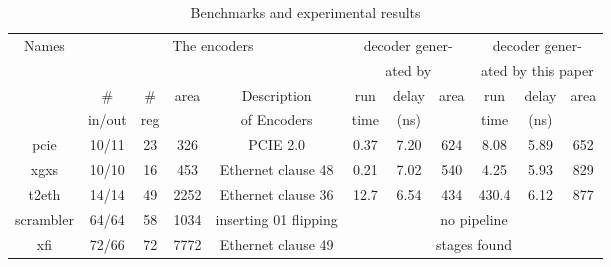 \documentclass[conference]{IEEEtran}
\begin{document}
\begin{table}[t]
\caption{Benchmarks and experimental results}
\begin{tabular}{|c|c|c|c|c|c|c|c|c|c|c|}
\hline
 Names     & \multicolumn{4}{|c|}{The encoders}                                  &   \multicolumn{3}{|c|}{decoder gener-}             &   \multicolumn{3}{|c|}{decoder gener-} \\    
           & \multicolumn{4}{|c|}{}                                              &   \multicolumn{3}{|c|}{ated by \cite{ShenTCAD11}}  &   \multicolumn{3}{|c|}{ated by this paper} \\\cline{2-11}
           &    \#   &   \#    &area  & Description                             &run  &delay&area                                     &run  &delay&area \\
           & in/out  &  reg    &      &   of Encoders                            &time &(ns) &                                        &time &(ns) &    \\\hline\hline
 pcie      & 10/11   & 23      & 326  &PCIE 2.0 \cite{pcie}                    &0.37 &7.20 &624                                     &8.08 & 5.89&652 \\\hline
 xgxs      & 10/10   & 16      & 453  &     Ethernet clause 48 \cite{IEEE8023_S4}&0.21 &7.02 &540                                     &4.25 & 5.93&829 \\\hline
 t2eth     & 14/14   & 49      & 2252 &    Ethernet clause 36 \cite{IEEE8023_S4} &12.7 &6.54 &434                                     &430.4& 6.12&877 \\\hline
scrambler  &64/64    & 58      & 1034 & inserting 01 flipping                    &     \multicolumn{6}{|c|}{no pipeline }\\\cline{1-5}
 xfi       & 72/66   & 72      & 7772 &     Ethernet clause 49 \cite{IEEE8023_S4}&     \multicolumn{6}{|c|}{stages found}\\\hline
\end{tabular}\label{tab_bench}
\end{table}


%            
%            
\end{document}
